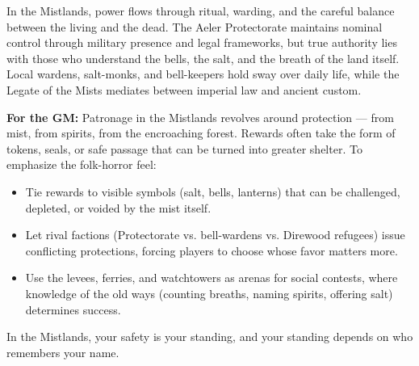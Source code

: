 \begin{tcolorbox}[colback=black!3,colframe=black!40!white,title={Patronage \& Power},breakable]
In the Mistlands, power flows through ritual, warding, and the careful balance between the living and the dead. The Aeler Protectorate maintains nominal control through military presence and legal frameworks, but true authority lies with those who understand the bells, the salt, and the breath of the land itself. Local wardens, salt-monks, and bell-keepers hold sway over daily life, while the Legate of the Mists mediates between imperial law and ancient custom.

\textbf{For the GM:}  
Patronage in the Mistlands revolves around protection --- from mist, from spirits, from the encroaching forest. Rewards often take the form of tokens, seals, or safe passage that can be turned into greater shelter. To emphasize the folk-horror feel:
\begin{itemize}
\item Tie rewards to visible symbols (salt, bells, lanterns) that can be challenged, depleted, or voided by the mist itself.
\item Let rival factions (Protectorate vs. bell-wardens vs. Direwood refugees) issue conflicting protections, forcing players to choose whose favor matters more.
\item Use the levees, ferries, and watchtowers as arenas for social contests, where knowledge of the old ways (counting breaths, naming spirits, offering salt) determines success.
\end{itemize}
In the Mistlands, your safety is your standing, and your standing depends on who remembers your name.
\end{tcolorbox}


